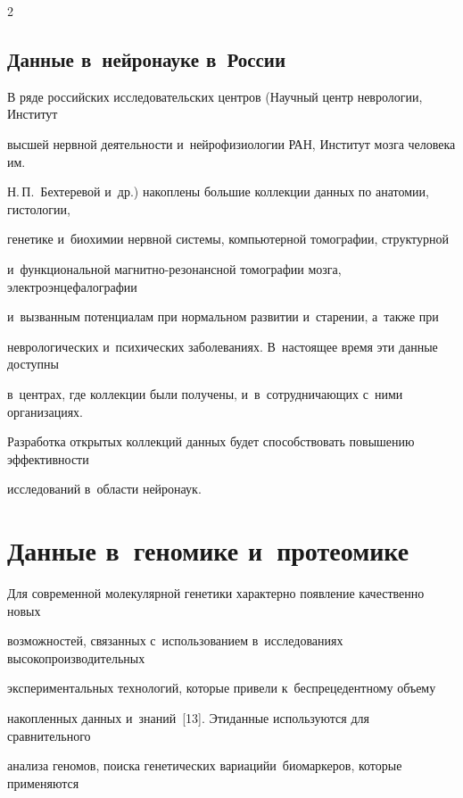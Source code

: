 \begin{multicols}{2}
\subsection{Данные в~нейронауке в~России}





В ряде российских исследовательских центров (Научный центр неврологии, Институт 


высшей нервной деятельности и~нейрофизиологии РАН, Институт мозга человека им.\ 


Н.\,П.~Бехтеревой и~др.) накоплены большие коллекции данных по анатомии, гистологии, 


генетике и~биохимии нервной системы, компьютерной томографии, структурной 


и~функциональной магнитно-резонансной томографии мозга, электроэнцефалографии 


и~вызванным потенциалам при нормальном развитии и~старении, а~так\-же при 


неврологических и~психических заболеваниях. В~настоящее время эти данные доступны 


в~центрах, где коллекции были получены, и~в~сотрудничающих с~ними организациях. 


Разработка открытых коллекций данных будет способствовать повышению эффективности 


исследований в~области нейронаук.





\section{Данные в~геномике и~протеомике}





  Для современной молекулярной генетики ха\-рак\-терно появление качественно новых 


возможно\-стей, связанных с~использованием в~исследованиях высокопроизводительных 


экспериментальных технологий, которые привели к~беспрецедентному объему 


накопленных данных и~знаний~[13]. Эти\linebreak данные используются для сравнительного 


ана\-лиза геномов, поиска генетических вариаций\linebreak и~биомаркеров, которые применяются 



\end{multicols}
